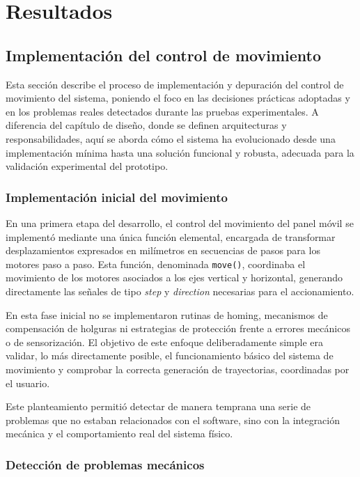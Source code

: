 \chapter{Resultados}
\section{Implementación del control de movimiento}

Esta sección describe el proceso de implementación y depuración del control de movimiento del sistema, poniendo el foco en las decisiones prácticas adoptadas y en los problemas reales detectados durante las pruebas experimentales. A diferencia del capítulo de diseño, donde se definen arquitecturas y responsabilidades, aquí se aborda cómo el sistema ha evolucionado desde una implementación mínima hasta una solución funcional y robusta, adecuada para la validación experimental del prototipo.

\subsection{Implementación inicial del movimiento}

En una primera etapa del desarrollo, el control del movimiento del panel móvil se implementó mediante una única función elemental, encargada de transformar desplazamientos expresados en milímetros en secuencias de pasos para los motores paso a paso. Esta función, denominada \texttt{move()}, coordinaba el movimiento de los motores asociados a los ejes vertical y horizontal, generando directamente las señales de tipo \textit{step} y \textit{direction} necesarias para el accionamiento.

En esta fase inicial no se implementaron rutinas de homing, mecanismos de compensación de holguras ni estrategias de protección frente a errores mecánicos o de sensorización. El objetivo de este enfoque deliberadamente simple era validar, lo más directamente posible, el funcionamiento básico del sistema de movimiento y comprobar la correcta generación de trayectorias, coordinadas por el usuario.

Este planteamiento permitió detectar de manera temprana una serie de problemas que no estaban relacionados con el software, sino con la integración mecánica y el comportamiento real del sistema físico.

\subsection{Detección de problemas mecánicos}

